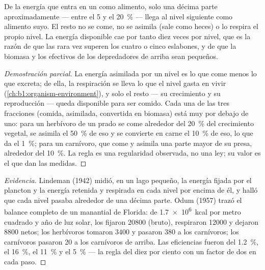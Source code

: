 \begin{theorem}\label{thm:b1:ecosystem-organization:lindeman}
De la energía que entra en un  como alimento, solo una décima
parte aproximadamente --- entre el \qty{5}{} y el \qty{20}{\%} --- llega al
nivel siguiente como alimento suyo. El resto no se come, no se asimila (sale
como heces) o lo respira el propio nivel. La energía disponible cae por
tanto diez veces por nivel, que es la razón de que las 
rara vez superen los cuatro o cinco eslabones, y de que la biomasa y los
efectivos de los depredadores de arriba sean pequeños.
\end{theorem}
\begin{proof}[Demostración parcial]
La energía asimilada por un nivel es lo que come menos lo que excreta; de
ella, la respiración se lleva lo que el nivel gasta en vivir
(\cref{ch:b1:organism-environment}), y solo el resto --- su crecimiento y su
reproducción --- queda disponible para ser comido. Cada una de las tres
fracciones (comida, asimilada, convertida en biomasa) está muy por debajo de
uno: para un herbívoro de un prado se come alrededor del \qty{20}{\%} del
crecimiento vegetal, se asimila el \qty{50}{\%} de eso y se convierte en
carne el \qty{10}{\%} de eso, lo que da el \qty{1}{\%}; para un carnívoro,
que come y asimila una parte mayor de su presa, alrededor del \qty{10}{\%}.
La regla es una regularidad observada, no una ley; su valor es el que dan
las medidas.
\end{proof}
\begin{proof}[Evidencia]
Lindeman (1942) midió, en un lago pequeño, la energía fijada por el plancton
y la energía retenida y respirada en cada nivel por encima de él, y halló
que cada nivel pasaba alrededor de una décima parte. Odum (1957) trazó el
balance completo de un manantial de Florida: de \qty{1.7e6}{kcal} por metro
cuadrado y año de luz solar, los  fijaron \num{20800} (bruto),
respiraron \num{12000} y dejaron \num{8800} netos; los herbívoros tomaron
\num{3400} y pasaron \num{380} a los carnívoros; los carnívoros pasaron
\num{20} a los carnívoros de arriba. Las eficiencias fueron del
\qty{1.2}{\%}, el \qty{16}{\%}, el \qty{11}{\%} y el \qty{5}{\%} --- la
regla del diez por ciento con un factor de dos en cada paso.
\end{proof}

